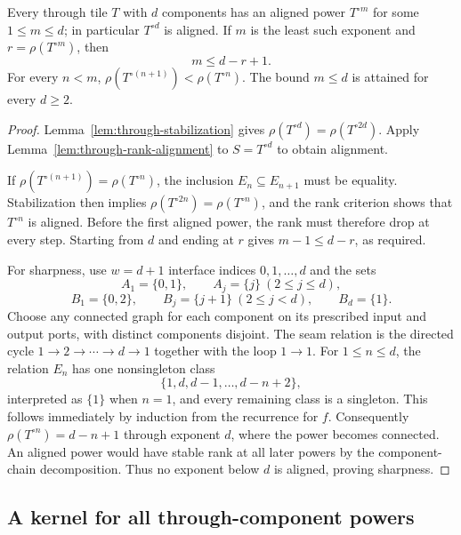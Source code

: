 \begin{theorem}
\label{thm:through-reblocking}
Every through tile $T$ with $d$ components has an aligned power
$T^{\circ m}$ for some $1\leq m\leq d$; in particular $T^{\circ d}$ is
aligned.  If $m$ is the least such exponent and $r=\rho(T^{\circ m})$, then
\[
 m\leq d-r+1.
\]
For every $n<m$,
$\rho(T^{\circ(n+1)})<\rho(T^{\circ n})$.
The bound $m\leq d$ is attained for every $d\geq2$.
\end{theorem}

\begin{proof}
Lemma~\ref{lem:through-stabilization} gives
$\rho(T^{\circ d})=\rho(T^{\circ2d})$.  Apply
Lemma~\ref{lem:through-rank-alignment} to $S=T^{\circ d}$ to obtain
alignment.

If $\rho(T^{\circ(n+1)})=\rho(T^{\circ n})$, the inclusion
$E_n\subseteq E_{n+1}$ must be equality.  Stabilization then implies
$\rho(T^{\circ2n})=\rho(T^{\circ n})$, and the rank criterion shows that
$T^{\circ n}$ is aligned.  Before the first aligned power, the rank must
therefore drop at every step.  Starting from $d$ and ending at $r$ gives
$m-1\leq d-r$, as required.

For sharpness, use $w=d+1$ interface indices $0,1,\ldots,d$ and the sets
\[
 A_1=\{0,1\},\qquad A_j=\{j\}\ (2\leq j\leq d),
\]
\[
 B_1=\{0,2\},\qquad B_j=\{j+1\}\ (2\leq j<d),\qquad B_d=\{1\}.
\]
Choose any connected graph for each component on its prescribed input and
output ports, with distinct components disjoint.  The seam relation is the
directed cycle $1\to2\to\cdots\to d\to1$ together with the loop $1\to1$.
For $1\leq n\leq d$, the relation $E_n$ has one nonsingleton class
\[
 \{1,d,d-1,\ldots,d-n+2\},
\]
interpreted as $\{1\}$ when $n=1$, and every remaining class is a singleton.
This follows immediately by induction from the recurrence for $f$.
Consequently $\rho(T^{\circ n})=d-n+1$ through exponent $d$, where the
power becomes connected.  An aligned power would have stable rank at all
later powers by the component-chain decomposition.  Thus no exponent below
$d$ is aligned, proving sharpness.
\end{proof}

\subsection{A kernel for all through-component powers}

